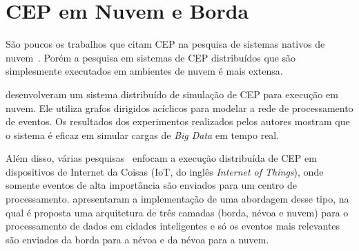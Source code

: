 



\section{CEP em Nuvem e Borda}





São poucos os trabalhos que citam CEP na pesquisa de sistemas nativos de nuvem~\citep{10.1145/2830013.2830016,10.1145/3401025.3401731,kritikos2019multi,10.1007/978-3-662-44879-3_7}. Porém a pesquisa em sistemas de CEP distribuídos que são simplesmente executados em  ambientes de nuvem é mais extensa.

\cite{higashino2016cepsim} desenvolveram um sistema distribuído de simulação de CEP para execução em nuvem. Ele utiliza grafos dirigidos acíclicos para modelar a rede de processamento de eventos.  Os resultados dos experimentos realizados pelos autores mostram que o sistema é eficaz em simular cargas de \textit{Big Data} em tempo real.


Além disso, várias pesquisas~\citep{7463825,7490807,9179545,8473459}
enfocam a execução distribuída de CEP em dispositivos de Internet da Coisas (IoT, do inglês \textit{Internet of Things}), onde somente eventos de alta importância são enviados para um centro de processamento. \cite{9018282} apresentaram a implementação de uma abordagem desse tipo, na qual é proposta uma arquitetura de três camadas (borda, névoa e nuvem) para o processamento de dados em cidades inteligentes e só os eventos mais relevantes são enviados da borda para a névoa e da névoa para a nuvem. 

